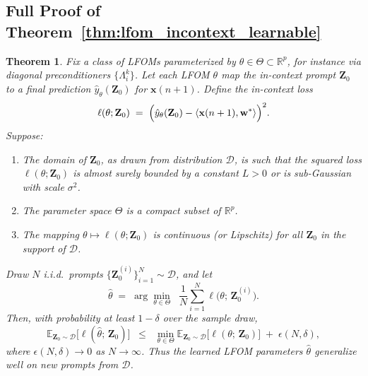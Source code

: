 \documentclass[11pt]{article}
\newtheorem*{theorem*}{Theorem}
\theoremstyle{plain}
\theoremstyle{definition}
\theoremstyle{remark}
\numberwithin{equation}{section}
\begin{document}
\subsection{Full Proof of Theorem~\ref{thm:lfom_incontext_learnable}}

\begin{theorem*}
Fix a class of LFOMs parameterized by $\theta \in \Theta \subset \mathbb{R}^p$, for instance via diagonal preconditioners $\{\Lambda_i^k\}$. Let each LFOM $\theta$ map the in-context prompt $\mathbf{Z}_0$ to a final prediction $\hat{y}_\theta(\mathbf{Z}_0)$ for $\mathbf{x}(n+1)$. Define the in-context loss
\[\ell(\theta; \mathbf{Z}_0) \;=\; \Bigl(\hat{y}_\theta(\mathbf{Z}_0) - \langle \mathbf{x}(n+1), \mathbf{w}^*\rangle \Bigr)^2.\]
Suppose:
\begin{enumerate}
    \item[(i)] The domain of $\mathbf{Z}_0$, as drawn from distribution $\mathcal{D}$, is such that the squared loss $\ell(\theta;\mathbf{Z}_0)$ is almost surely bounded by a constant $L>0$ or is sub-Gaussian with scale $\sigma^2$.
    \item[(ii)] The parameter space $\Theta$ is a compact subset of $\mathbb{R}^p$.
    \item[(iii)] The mapping $\theta \mapsto \ell(\theta;\mathbf{Z}_0)$ is continuous (or Lipschitz) for all $\mathbf{Z}_0$ in the support of $\mathcal{D}$.
\end{enumerate}

Draw $N$ i.i.d.\ prompts $\{\mathbf{Z}_0^{(i)}\}_{i=1}^N \sim \mathcal{D}$, and let
\[\widehat{\theta} \;=\; \arg\min_{\theta\in\Theta} \;\;\frac{1}{N}\sum_{i=1}^N \ell\!\bigl(\theta;\,\mathbf{Z}_0^{(i)}\bigr).\]
Then, with probability at least $1-\delta$ over the sample draw,
\[\mathbb{E}_{\mathbf{Z}_0 \sim \mathcal{D}} \bigl[\ell(\widehat{\theta};\,\mathbf{Z}_0)\bigr] \;\;\le\;\; \min_{\theta \in \Theta} \mathbb{E}_{\mathbf{Z}_0 \sim \mathcal{D}} \bigl[\ell(\theta;\,\mathbf{Z}_0)\bigr] \;+\;\epsilon(N,\delta),\]
where $\epsilon(N,\delta)\to 0$ as $N\to \infty$. Thus the learned LFOM parameters $\widehat{\theta}$ generalize well on new prompts from $\mathcal{D}$.
\end{theorem*}
\end{document}
